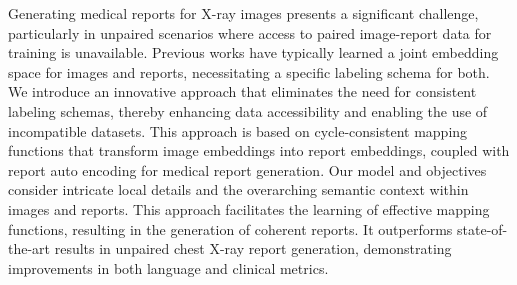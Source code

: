 Generating medical reports for X-ray images presents a significant challenge, particularly in unpaired scenarios where access to paired image-report data for training is unavailable. Previous works have typically learned a joint embedding space for images and reports, necessitating a specific labeling schema for both.  We introduce an innovative approach that eliminates the need for consistent labeling schemas, thereby enhancing data accessibility and enabling the use of incompatible datasets. This approach is based on cycle-consistent mapping functions that transform image embeddings into report embeddings, coupled with report auto encoding for medical report generation. Our model and objectives consider intricate local details and the overarching semantic context within images and reports.  This approach facilitates the learning of effective mapping functions, resulting in the generation of coherent reports. It outperforms state-of-the-art results in unpaired chest X-ray report generation, demonstrating improvements in both language and clinical metrics.